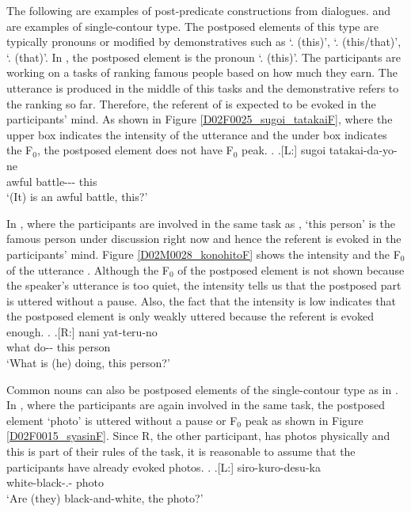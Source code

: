 The following are examples of post-predicate constructions from dialogues.
\Next and \NNext are examples of single-contour type.
The postposed elements of this type are typically pronouns or modified by demonstratives such as  `. (this)',  `. (this/that)',  `. (that)'.
In \Next,
the postposed element is the pronoun  `. (this)'.
The participants are working on a tasks of ranking famous people based on how much they earn.
The utterance is produced in the middle of this tasks and
the demonstrative  refers to the ranking so far.
Therefore, the referent of  is expected to be evoked in the participants' mind.
As shown in Figure \ref{D02F0025_sugoi_tatakaiF},
where the upper box indicates the intensity of the utterance
and the under box indicates the F$_{0}$,
the postposed element  does not have F$_{0}$ peak.
%
\ex. \label{D02F0025_sugoi_tatakai}
	\ag.[L:] sugoi tatakai-da-yo-ne  \\
	awful battle--- this \\
	`(It) is an awful battle, this?'

In \Next,
where the participants are involved in the same task as \Last,
 `this person' is the famous person under discussion right now and hence the referent is evoked in the participants' mind.
Figure \ref{D02M0028_konohitoF} shows the intensity and the F$_{0}$ of the utterance \Next.
Although the F$_{0}$ of the postposed element is not shown because the speaker's utterance is too quiet,
the intensity tells us that
the postposed part is uttered without a pause.
Also, the fact that the intensity is low indicates that the postposed element is only weakly uttered because the referent is evoked enough.
%
\ex.\label{D02M0028_konohito}
	\ag.[R:] nani yat-teru-no   \\
			what do-- this person \\
			`What is (he) doing, this person?'

Common nouns can also be postposed elements of the single-contour type as in \Next.
In \Next, where the participants are again involved in the same task,
the postposed element  `photo' is uttered without a pause or F$_{0}$ peak as shown in Figure \ref{D02F0015_syasinF}.
Since R, the other participant, has photos physically and this is part of their rules of the task,
it is reasonable to assume that the participants have already evoked photos.
%
\ex.\label{D02F0015_syasin}
	\ag.[L:] siro-kuro-desu-ka  \\
		white-black-.- photo \\
		`Are (they) black-and-white, the photo?'

